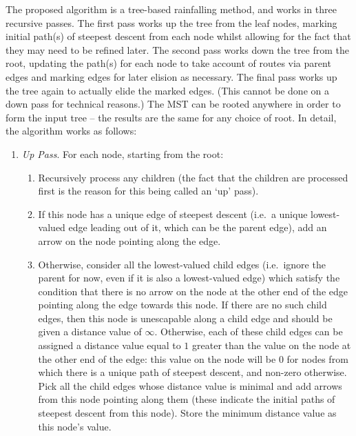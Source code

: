 The proposed algorithm is a tree-based rainfalling method, and works in three recursive passes. The first pass works up the tree from the leaf nodes, marking initial path(s) of steepest descent from each node whilst allowing for the fact that they may need to be refined later. The second pass works down the tree from the root, updating the path(s) for each node to take account of routes via parent edges and marking edges for later elision as necessary. The final pass works up the tree again to actually elide the marked edges. (This cannot be done on a down pass for technical reasons.) The MST can be rooted anywhere in order to form the input tree -- the results are the same for any choice of root. In detail, the algorithm works as follows:

\begin{enumerate}

\item \emph{Up Pass}. For each node, starting from the root:

\begin{enumerate}

\item Recursively process any children (the fact that the children are processed first is the reason for this being called an `up' pass).

\item If this node has a unique edge of steepest descent (i.e.~a unique lowest-valued edge leading out of it, which can be the parent edge), add an arrow on the node pointing along the edge.

\item Otherwise, consider all the lowest-valued child edges (i.e.~ignore the parent for now, even if it is also a lowest-valued edge) which satisfy the condition that there is no arrow on the node at the other end of the edge pointing along the edge towards this node. If there are no such child edges, then this node is unescapable along a child edge and should be given a distance value of $\infty$. Otherwise, each of these child edges can be assigned a distance value equal to $1$ greater than the value on the node at the other end of the edge: this value on the node will be $0$ for nodes from which there is a unique path of steepest descent, and non-zero otherwise. Pick all the child edges whose distance value is minimal and add arrows from this node pointing along them (these indicate the initial paths of steepest descent from this node). Store the minimum distance value as this node's value.


\end{enumerate}
\end{enumerate}
